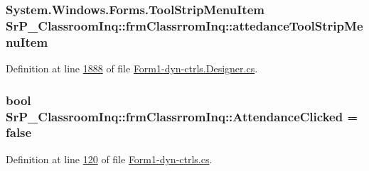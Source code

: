 \hypertarget{class_sr_p___classroom_inq_1_1frm_classrrom_inq_a2ccfb297c675044ba746ce9c6839c2bc}{
\subsubsection[{attedance\-Tool\-Strip\-Menu\-Item}]{\setlength{\rightskip}{0pt plus 5cm}\-System.\-Windows.\-Forms.\-Tool\-Strip\-Menu\-Item {\bf \-Sr\-P\-\_\-\-Classroom\-Inq\-::frm\-Classrrom\-Inq\-::attedance\-Tool\-Strip\-Menu\-Item}}}
\label{class_sr_p___classroom_inq_1_1frm_classrrom_inq_a2ccfb297c675044ba746ce9c6839c2bc}


\-Definition at line \hyperlink{_form1-dyn-ctrls_8_designer_8cs_source_l01888}{1888} of file \hyperlink{_form1-dyn-ctrls_8_designer_8cs_source}{\-Form1-\/dyn-\/ctrls.\-Designer.\-cs}.

\hypertarget{class_sr_p___classroom_inq_1_1frm_classrrom_inq_a319172bf9b9e58ec37499658a5289284}{
\subsubsection[{\-Attendance\-Clicked}]{\setlength{\rightskip}{0pt plus 5cm}bool {\bf \-Sr\-P\-\_\-\-Classroom\-Inq\-::frm\-Classrrom\-Inq\-::\-Attendance\-Clicked} = false}}
\label{class_sr_p___classroom_inq_1_1frm_classrrom_inq_a319172bf9b9e58ec37499658a5289284}


\-Definition at line \hyperlink{_form1-dyn-ctrls_8cs_source_l00120}{120} of file \hyperlink{_form1-dyn-ctrls_8cs_source}{\-Form1-\/dyn-\/ctrls.\-cs}.

